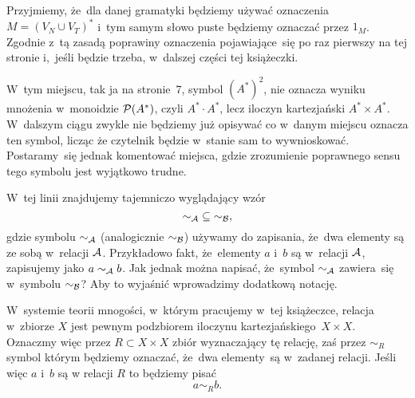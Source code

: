 \documentclass[a4paper,11pt]{article}
\begin{document}
\vspace{\spaceFour}





 Przyjmiemy, że~dla danej gramatyki będziemy używać
oznaczenia $M = ( V_{ N } \cup V_{ T } )^{ * }$ i~tym samym słowo puste będziemy
oznaczać przez $1_{ M }$. Zgodnie z~tą zasadą poprawiny oznaczenia
pojawiające~się po raz pierwszy na tej stronie i,~jeśli będzie trzeba,
w~dalszej części tej książeczki.

\vspace{\spaceFour}





 W~tym miejscu, tak ja na stronie~7, symbol
$( A^{ * } )^{ 2 }$, nie oznacza wyniku mnożenia w~monoidzie
$\mathcal{P}( A^{ * } )$, czyli $A^{ * } \cdot A^{ * }$, lecz iloczyn kartezjański
$A^{ * } \times A^{ * }$. W~dalszym ciągu zwykle nie będziemy już opisywać co
w~danym miejscu oznacza ten symbol, licząc że czytelnik będzie w~stanie sam
to wywnioskować. Postaramy~się jednak komentować miejsca, gdzie zrozumienie
poprawnego sensu tego symbolu jest wyjątkowo trudne.

\vspace{\spaceFour}





 W~tej linii znajdujemy tajemniczo wyglądający wzór
\begin{equation}
  \label{eq:Forys-Forys-82}
  \sim_{ \mathcal{A} } \; \subseteq \; \sim_{ \mathcal{B} },
\end{equation}
gdzie symbolu $\sim_{ \mathcal{A} }$ (analogicznie $\sim_{ \mathcal{B} }$) używamy do zapisania,
że~dwa elementy są ze sobą w~relacji $\mathcal{A}$. Przykładowo fakt, że~elementy
$a$ i~$b$ są w~relacji $\mathcal{A}$, zapisujemy jako $a \sim_{ \mathcal{A} } b$. Jak
jednak można napisać, że~symbol $\sim_{ \mathcal{A} }$ zawiera~się w~symbolu
$\sim_{ \mathcal{B} }$? Aby to wyjaśnić wprowadzimy dodatkową notację.

W~systemie teorii mnogości, w~którym pracujemy w~tej książeczce, relacja
w~zbiorze $X$ jest pewnym podzbiorem iloczynu kartezjańskiego~$X \times X$.
Oznaczmy więc przez $R \subset X \times X$ zbiór wyznaczający tę relację, zaś przez
$\sim_{ R }$ symbol którym będziemy oznaczać, że~dwa elementy~są w~zadanej
relacji. Jeśli więc $a$ i~$b$ są w relacji $R$ to będziemy pisać
\begin{equation}
  \label{eq:Forys-Forys-83}
  a \sim_{ R } b.
\end{equation}
\end{document}
